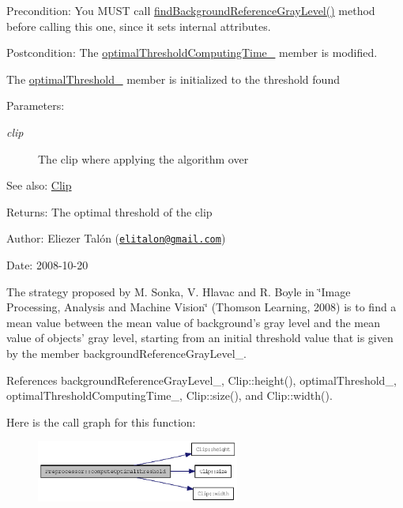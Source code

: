 \begin{Desc}
\item[Precondition:]You MUST call \hyperlink{class_preprocessor_a941f81382bd8e235e4dd12481342be4}{findBackgroundReferenceGrayLevel()} method before calling this one, since it sets internal attributes.\end{Desc}
\begin{Desc}
\item[Postcondition:]The \hyperlink{class_preprocessor_d52352691de7d8f0738b67e93a5898fc}{optimalThresholdComputingTime\_\-} member is modified. 

The \hyperlink{class_preprocessor_865b1e28dd9535b96f70727a550104fe}{optimalThreshold\_\-} member is initialized to the threshold found\end{Desc}
\begin{Desc}
\item[Parameters:]
\begin{description}
\item[{\em clip}]The clip where applying the algorithm over\end{description}
\end{Desc}
\begin{Desc}
\item[See also:]\hyperlink{class_clip}{Clip}\end{Desc}
\begin{Desc}
\item[Returns:]The optimal threshold of the clip\end{Desc}
\begin{Desc}
\item[Author:]Eliezer Talón (\href{mailto:elitalon@gmail.com}{\tt elitalon@gmail.com}) \end{Desc}
\begin{Desc}
\item[Date:]2008-10-20\end{Desc}
The strategy proposed by M. Sonka, V. Hlavac and R. Boyle in \char`\"{}Image Processing, Analysis and Machine Vision\char`\"{} (Thomson Learning, 2008) is to find a mean value between the mean value of background's gray level and the mean value of objects' gray level, starting from an initial threshold value that is given by the member backgroundReferenceGrayLevel\_\-. 

References backgroundReferenceGrayLevel\_\-, Clip::height(), optimalThreshold\_\-, optimalThresholdComputingTime\_\-, Clip::size(), and Clip::width().

Here is the call graph for this function:\nopagebreak
\begin{figure}[H]
\begin{center}
\leavevmode
\includegraphics[width=189pt]{class_preprocessor_ac2f414d6f4f917419f33f6067eb8634_cgraph}
\end{center}
\end{figure}


